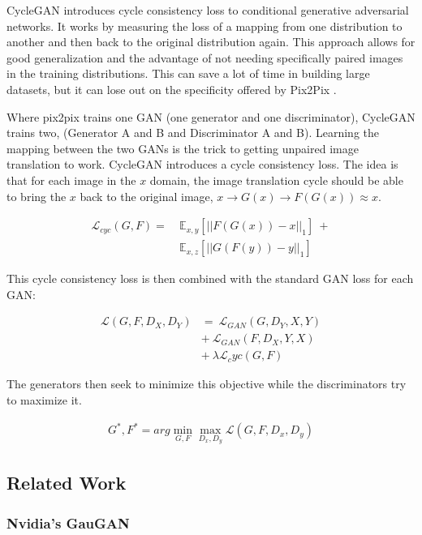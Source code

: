 \documentclass[twocolumn]{article}
\begin{document}
	CycleGAN introduces cycle consistency loss to conditional generative adversarial networks. It works by measuring the loss of a mapping from one distribution to another and then back to the original distribution again. This approach allows for good generalization and the advantage of not needing specifically paired images in the training distributions. This can save a lot of time in building large datasets, but it can lose out on the specificity offered by Pix2Pix \cite{zhu2017unpaired}.
	
	Where pix2pix trains one GAN (one generator and one discriminator), CycleGAN trains two, (Generator A and B and Discriminator A and B). Learning the mapping between the two GANs is the trick to getting unpaired image translation to work. CycleGAN introduces a cycle consistency loss. The idea is that for each image in the $x$ domain, the image translation cycle should be able to bring the $x$ back to the original image, $x \rightarrow G(x) \rightarrow F(G(x)) \approx x$.
	
	\begin{align*}
		\mathcal{L}_{cyc}(G, F) =\ & \mathbb{E}_{x,y}[||F(G(x)) - x||_1]\ + \\
		& \mathbb{E}_{x,z}[||G(F(y)) - y||_1]
	\end{align*}
	
	This cycle consistency loss is then combined with the standard GAN loss for each GAN:
	
	\begin{align*}
		\mathcal{L}(G, F, D_X, D_Y) &=\ \mathcal{L}_{GAN}(G, D_Y, X, Y) \\
		&+\ \mathcal{L}_{GAN}(F, D_X, Y, X) \\
		&+\ \lambda \mathcal{L}_cyc (G, F)  
	\end{align*}
	
	The generators then seek to minimize this objective while the discriminators try to maximize it.
	
	\begin{align*}
		G^*, F^* = arg \mathop{min}_{G,F} \mathop{max}_{D_x, D_y} \mathcal{L}(G, F, D_x, D_y)
	\end{align*}

	\subsection{Related Work}
	
	\subsubsection{Nvidia's GauGAN}
	
\end{document}
